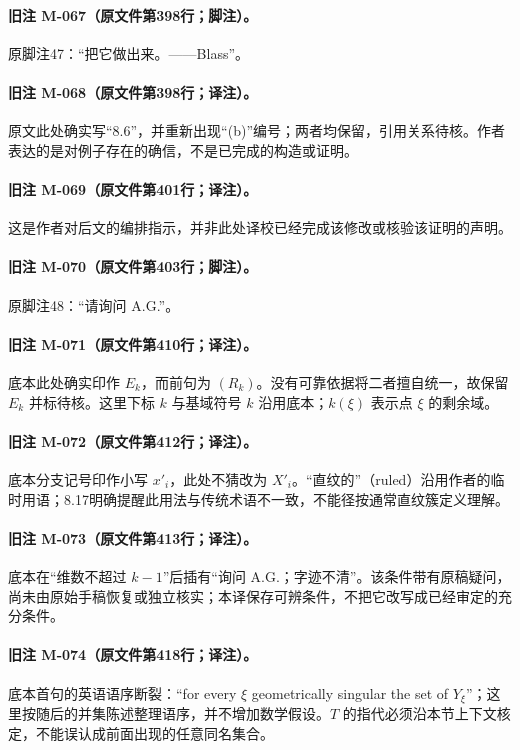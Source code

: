 \paragraph{旧注 M-067（原文件第398行；脚注）。}
原脚注47：“把它做出来。——Blass”。

\paragraph{旧注 M-068（原文件第398行；译注）。}
原文此处确实写“8.6”，并重新出现“(b)”编号；两者均保留，引用关系待核。作者表达的是对例子存在的确信，不是已完成的构造或证明。

\paragraph{旧注 M-069（原文件第401行；译注）。}
这是作者对后文的编排指示，并非此处译校已经完成该修改或核验该证明的声明。

\paragraph{旧注 M-070（原文件第403行；脚注）。}
原脚注48：“请询问 A.G.”。

\paragraph{旧注 M-071（原文件第410行；译注）。}
底本此处确实印作 $E_k$，而前句为 $(R_k)$。没有可靠依据将二者擅自统一，故保留 $E_k$ 并标待核。这里下标 $k$ 与基域符号 $k$ 沿用底本；$k(\xi)$ 表示点 $\xi$ 的剩余域。

\paragraph{旧注 M-072（原文件第412行；译注）。}
底本分支记号印作小写 $x'_i$，此处不猜改为 $X'_i$。“直纹的”（ruled）沿用作者的临时用语；8.17明确提醒此用法与传统术语不一致，不能径按通常直纹簇定义理解。

\paragraph{旧注 M-073（原文件第413行；译注）。}
底本在“维数不超过 $k-1$”后插有“询问 A.G.；字迹不清”。该条件带有原稿疑问，尚未由原始手稿恢复或独立核实；本译保存可辨条件，不把它改写成已经审定的充分条件。

\paragraph{旧注 M-074（原文件第418行；译注）。}
底本首句的英语语序断裂：“for every $\xi$ geometrically singular the set of $Y_\xi$”；这里按随后的并集陈述整理语序，并不增加数学假设。$T$ 的指代必须沿本节上下文核定，不能误认成前面出现的任意同名集合。

